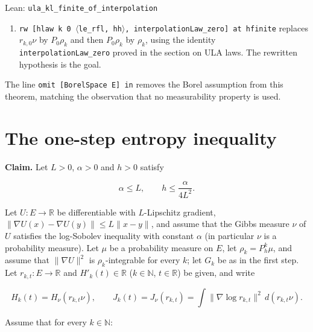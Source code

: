 \documentclass[11pt,a4paper]{article}
\begin{document}
\begin{leanbox}{Lean: \texttt{ula\_\allowbreak{}kl\_\allowbreak{}finite\_\allowbreak{}of\_\allowbreak{}interpolation}}
\begin{enumerate}
\item \texttt{rw [hlaw k 0 \ensuremath{\langle}le\_\allowbreak{}rfl, hh\ensuremath{\rangle}, interpolation\allowbreak{}Law\_\allowbreak{}zero] at hfinite} replaces \(r_{k,0}\nu\) by \(P_0\rho_k\) and then \(P_0\rho_k\) by \(\rho_k\), using the identity \texttt{interpolation\allowbreak{}Law\_\allowbreak{}zero} proved in the section on ULA laws. The rewritten hypothesis is the goal.

\end{enumerate}



The line \texttt{omit [Borel\allowbreak{}Space E] in} removes the Borel assumption from this theorem, matching the observation that no measurability property is used.
\end{leanbox}

\section{\texorpdfstring{The one-step entropy inequality}{The one-step entropy inequality}}


\textbf{Claim.} Let \(L>0\), \(\alpha>0\) and \(h>0\) satisfy


\[\alpha\le L,\qquad h\le\frac{\alpha}{4L^2}.\]


Let \(U:E\to\mathbb R\) be differentiable with \(L\)-Lipschitz gradient, \(\|\nabla U(x)-\nabla U(y)\|\le L\|x-y\|\), and assume that the Gibbs measure \(\nu\) of \(U\) satisfies the log-Sobolev inequality with constant \(\alpha\) (in particular \(\nu\) is a probability measure). Let \(\mu\) be a probability measure on \(E\), let \(\rho_k=P_h^k\mu\), and assume that \(\|\nabla U\|^2\) is \(\rho_k\)-integrable for every \(k\); let \(G_k\) be as in the first step. Let \(r_{k,t}:E\to\mathbb R\) and \(H'_k(t)\in\mathbb R\) (\(k\in\mathbb N\), \(t\in\mathbb R\)) be given, and write


\[H_k(t)=H_\nu(r_{k,t}\nu),\qquad J_k(t)=J_\nu(r_{k,t})=\int\|\nabla\log r_{k,t}\|^2\,d(r_{k,t}\nu).\]


Assume that for every \(k\in\mathbb N\):
\end{document}
